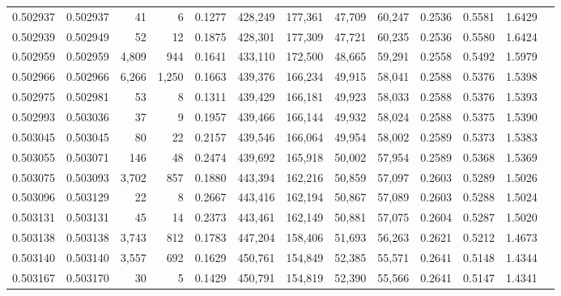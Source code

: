 \begin{tabular}{rrrrrrrrrrrrr}
0.502937 & 0.502937 &    41 &     6 &                                     0.1277 & 428,249 & 177,361 &  47,709 &  60,247 & 0.2536 & 0.5581 & 1.6429 \\
0.502939 & 0.502949 &    52 &    12 &                                     0.1875 & 428,301 & 177,309 &  47,721 &  60,235 & 0.2536 & 0.5580 & 1.6424 \\
0.502959 & 0.502959 & 4,809 &   944 &                                     0.1641 & 433,110 & 172,500 &  48,665 &  59,291 & 0.2558 & 0.5492 & 1.5979 \\
0.502966 & 0.502966 & 6,266 & 1,250 &                                     0.1663 & 439,376 & 166,234 &  49,915 &  58,041 & 0.2588 & 0.5376 & 1.5398 \\
0.502975 & 0.502981 &    53 &     8 &                                     0.1311 & 439,429 & 166,181 &  49,923 &  58,033 & 0.2588 & 0.5376 & 1.5393 \\
0.502993 & 0.503036 &    37 &     9 &                                     0.1957 & 439,466 & 166,144 &  49,932 &  58,024 & 0.2588 & 0.5375 & 1.5390 \\
0.503045 & 0.503045 &    80 &    22 &                                     0.2157 & 439,546 & 166,064 &  49,954 &  58,002 & 0.2589 & 0.5373 & 1.5383 \\
0.503055 & 0.503071 &   146 &    48 &                                     0.2474 & 439,692 & 165,918 &  50,002 &  57,954 & 0.2589 & 0.5368 & 1.5369 \\
0.503075 & 0.503093 & 3,702 &   857 &                                     0.1880 & 443,394 & 162,216 &  50,859 &  57,097 & 0.2603 & 0.5289 & 1.5026 \\
0.503096 & 0.503129 &    22 &     8 &                                     0.2667 & 443,416 & 162,194 &  50,867 &  57,089 & 0.2603 & 0.5288 & 1.5024 \\
0.503131 & 0.503131 &    45 &    14 &                                     0.2373 & 443,461 & 162,149 &  50,881 &  57,075 & 0.2604 & 0.5287 & 1.5020 \\
0.503138 & 0.503138 & 3,743 &   812 &                                     0.1783 & 447,204 & 158,406 &  51,693 &  56,263 & 0.2621 & 0.5212 & 1.4673 \\
0.503140 & 0.503140 & 3,557 &   692 &                                     0.1629 & 450,761 & 154,849 &  52,385 &  55,571 & 0.2641 & 0.5148 & 1.4344 \\
0.503167 & 0.503170 &    30 &     5 &                                     0.1429 & 450,791 & 154,819 &  52,390 &  55,566 & 0.2641 & 0.5147 & 1.4341 \\

\end{tabular}

